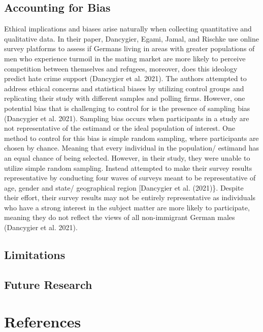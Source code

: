\documentclass[
]{article}
\begin{document}
\hypertarget{accounting-for-bias}{%
\subsection{Accounting for Bias}\label{accounting-for-bias}}

Ethical implications and biases arise naturally when collecting
quantitative and qualitative data. In their paper, Dancygier, Egami,
Jamal, and Rischke use online survey platforms to assess if Germans
living in areas with greater populations of men who experience turmoil
in the mating market are more likely to perceive competition between
themselves and refugees, moreover, does this ideology predict hate crime
support (Dancygier et al. 2021). The authors attempted to address
ethical concerns and statistical biases by utilizing control groups and
replicating their study with different samples and polling firms.
However, one potential bias that is challenging to control for is the
presence of sampling bias (Dancygier et al. 2021). Sampling bias occurs
when participants in a study are not representative of the estimand or
the ideal population of interest. One method to control for this bias is
simple random sampling, where participants are chosen by chance. Meaning
that every individual in the population/ estimand has an equal chance of
being selected. However, in their study, they were unable to utilize
simple random sampling. Instead attempted to make their survey results
representative by conducting four waves of surveys meant to be
representative of age, gender and state/ geographical region
{[}Dancygier et al. (2021)\}. Despite their effort, their survey results
may not be entirely representative as individuals who have a strong
interest in the subject matter are more likely to participate, meaning
they do not reflect the views of all non-immigrant German males
(Dancygier et al. 2021).

\hypertarget{limitations}{%
\subsection{Limitations}\label{limitations}}

\hypertarget{future-research}{%
\subsection{Future Research}\label{future-research}}

\clearpage

\hypertarget{references}{%
\section*{References}\label{references}}
\end{document}
